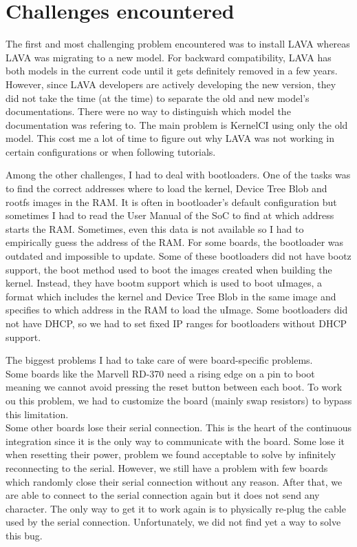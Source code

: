 \section{Challenges encountered}
The first and most challenging problem encountered was to install LAVA whereas LAVA was migrating to a new model. For backward compatibility, LAVA has both models in the current code until it gets definitely removed in a few years. However, since LAVA developers are actively developing the new version, they did not take the time (at the time) to separate the old and new model's documentations. There were no way to distinguish which model the documentation was refering to. The main problem is KernelCI using only the old model. This cost me a lot of time to figure out why LAVA was not working in certain configurations or when following tutorials.

Among the other challenges, I had to deal with bootloaders. One of the tasks was to find the correct addresses where to load the kernel, Device Tree Blob and rootfs images in the RAM. It is often in bootloader's default configuration but sometimes I had to read the User Manual of the SoC to find at which address starts the RAM. Sometimes, even this data is not available so I had to empirically guess the address of the RAM. For some boards, the bootloader was outdated and impossible to update. Some of these bootloaders did not have bootz support, the boot method used to boot the images created when building the kernel. Instead, they have bootm support which is used to boot uImages, a format which includes the kernel and Device Tree Blob in the same image and specifies to which address in the RAM to load the uImage. Some bootloaders did not have DHCP, so we had to set fixed IP ranges for bootloaders without DHCP support.

The biggest problems I had to take care of were board-specific problems.\\
Some boards like the Marvell RD-370 need a rising edge on a pin to boot meaning we cannot avoid pressing the reset button between each boot. To work ou this problem, we had to customize the board (mainly swap resistors) to bypass this limitation.\\
Some other boards lose their serial connection. This is the heart of the continuous integration since it is the only way to communicate with the board. Some lose it when resetting their power, problem we found acceptable to solve by infinitely reconnecting to the serial. However, we still have a problem with few boards which randomly close their serial connection without any reason. After that, we are able to connect to the serial connection again but it does not send any character. The only way to get it to work again is to physically re-plug the cable used by the serial connection. Unfortunately, we did not find yet a way to solve this bug.

